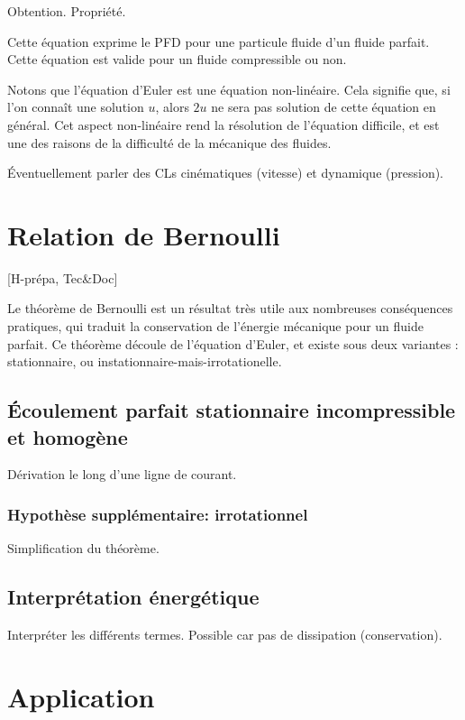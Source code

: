 \documentclass[11pt]{report}
\numberwithin{figure}{section}
\numberwithin{equation}{section}
\numberwithin{table}{section}
\newcommand{\1}{\boldsymbol{1}}
\begin{document}
Obtention. Propriété.

Cette équation exprime le PFD pour une particule fluide d'un fluide parfait. Cette équation est valide pour un fluide compressible ou non.

Notons que l'équation d'Euler est une équation non-linéaire. Cela signifie que, si l'on connaît une solution $u$, alors $2u$ ne sera pas solution de cette équation en général. Cet aspect non-linéaire rend la résolution de l'équation difficile, et est une des raisons de la difficulté de la mécanique des fluides.

Éventuellement parler des CLs cinématiques (vitesse) et dynamique (pression).

\section{Relation de Bernoulli}

[H-prépa, Tec\&Doc]

Le théorème de Bernoulli est un résultat très utile aux nombreuses conséquences pratiques,
qui traduit la conservation de l'énergie mécanique pour un fluide parfait. Ce théorème découle de l'équation d'Euler, et existe sous deux variantes : stationnaire, ou instationnaire-mais-irrotationelle.

\subsection{Écoulement parfait stationnaire incompressible et homogène}

Dérivation le long d'une ligne de courant.

\subsubsection{Hypothèse supplémentaire: irrotationnel}

Simplification du théorème.

\subsection{Interprétation énergétique}

Interpréter les différents termes. Possible car pas de dissipation (conservation).

\section{Application}
\end{document}
